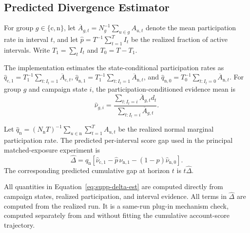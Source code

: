 \subsection{Predicted Divergence Estimator}
\label{sec:supp-rotation-prediction}

For group $g\in\{\mathrm c,\mathrm n\}$, let
$\overline A_{g,t}=N_g^{-1}\sum_{u\in g}A_{u,t}$ denote the mean
participation rate in interval $t$, and let
$\widehat p=T^{-1}\sum_{t=1}^{T}I_t$ be the realized fraction of active
intervals. Write
$T_1=\sum_t I_t$ and $T_0=T-T_1$.

The implementation estimates the state-conditional participation rates as
$\widehat q_{\mathrm c,1}
=T_1^{-1}\sum_{t:I_t=1}\overline A_{\mathrm c,t}$,
$\widehat q_{\mathrm n,1}
=T_1^{-1}\sum_{t:I_t=1}\overline A_{\mathrm n,t}$, and
$\widehat q_{\mathrm n,0}
=T_0^{-1}\sum_{t:I_t=0}\overline A_{\mathrm n,t}$.
For group $g$ and campaign state $i$, the participation-conditioned evidence
mean is
\[
\widehat\nu_{g,i}
=
\frac{
\sum_{t:I_t=i}\overline A_{g,t}d_t
}{
\sum_{t:I_t=i}\overline A_{g,t}
}.
\]

Let
$\widehat q_{\mathrm n}
=(N_{\mathrm n}T)^{-1}
\sum_{u\in\mathrm n}\sum_{t=1}^{T}A_{u,t}$
be the realized normal marginal participation rate. The predicted
per-interval score gap used in the principal matched-exposure experiment is
\begin{equation}
\label{eq:supp-delta-est}
\widehat\Delta
=
\widehat q_{\mathrm n}
\left[
\widehat\nu_{\mathrm c,1}
-
\widehat p\,\widehat\nu_{\mathrm n,1}
-
(1-\widehat p)\widehat\nu_{\mathrm n,0}
\right].
\end{equation}
The corresponding predicted cumulative gap at horizon $t$ is
$t\widehat\Delta$.

All quantities in Equation~\eqref{eq:supp-delta-est} are computed directly
from campaign states, realized participation, and interval evidence. All terms in $\widehat{\Delta}$ are computed from the realized run.
It is a same-run plug-in mechanism check, computed separately from
and without fitting the cumulative account-score trajectory.



